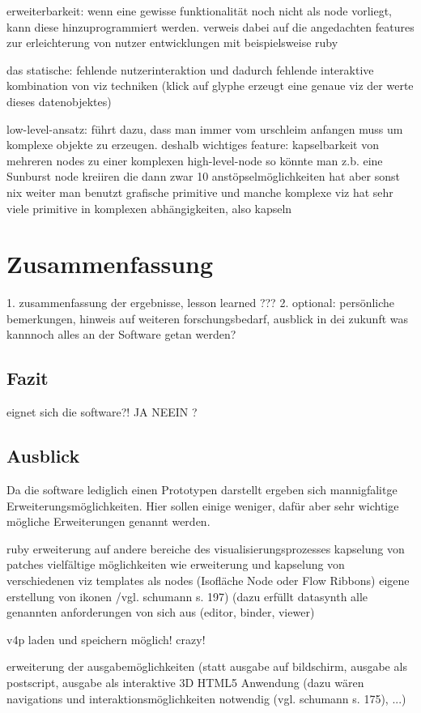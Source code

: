 \documentclass[a4paper, 12pt, DIVcalc, onepage, pdftex, headsepline, footsepline]{scrreprt}
\begin{document}
erweiterbarkeit:
wenn eine gewisse funktionalität noch nicht als node vorliegt, kann diese hinzuprogrammiert werden. verweis dabei auf die angedachten features zur erleichterung von nutzer entwicklungen mit beispielsweise ruby

das statische:
fehlende nutzerinteraktion und dadurch fehlende interaktive kombination von viz techniken (klick auf glyphe erzeugt eine genaue viz der werte dieses datenobjektes)

low-level-ansatz:
führt dazu, dass man immer vom urschleim anfangen muss um komplexe objekte zu erzeugen. deshalb wichtiges feature: kapselbarkeit von mehreren nodes zu einer komplexen high-level-node
so könnte man z.b. eine Sunburst node kreiiren die dann zwar 10 anstöpselmöglichkeiten hat aber sonst nix weiter
man benutzt grafische primitive und manche komplexe viz hat sehr viele primitive in komplexen abhängigkeiten, also kapseln

\chapter{Zusammenfassung}
\label{cha:Zusammenfassung}
1. zusammenfassung der ergebnisse, lesson learned
???
2. optional: persönliche bemerkungen, hinweis auf weiteren forschungsbedarf, ausblick in dei zukunft
was kannnoch alles an der Software getan werden?
\section{Fazit}
\label{sec:Fazit}
eignet sich die software?! JA NEEIN ?
\section{Ausblick}
\label{sec:Ausblick}
Da die software lediglich einen Prototypen darstellt ergeben sich mannigfalitge Erweiterungsmöglichkeiten. Hier sollen einige weniger, dafür aber sehr wichtige mögliche Erweiterungen genannt werden.

ruby
erweiterung auf andere bereiche des visualisierungsprozesses
kapselung von patches
  vielfältige möglichkeiten wie
    erweiterung und kapselung von verschiedenen viz templates als nodes (Isofläche Node oder Flow Ribbons)
    eigene erstellung von ikonen /vgl. schumann s. 197)
    (dazu erfüllt datasynth alle genannten anforderungen von sich aus (editor, binder, viewer)

v4p laden und speichern möglich! crazy!

erweiterung der ausgabemöglichkeiten (statt ausgabe auf bildschirm, ausgabe als postscript, ausgabe als interaktive 3D HTML5 Anwendung (dazu wären navigations und interaktionsmöglichkeiten notwendig (vgl. schumann s. 175), ...)
\end{document}

